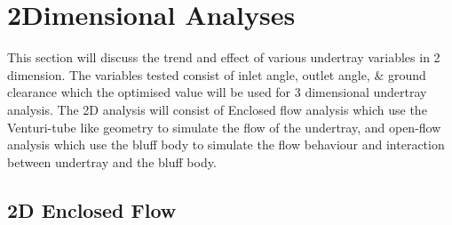 \newpage
\section{2Dimensional Analyses}
This section will discuss the trend and effect of various undertray variables in 2 dimension. The variables tested consist of inlet angle, outlet angle, \& ground clearance which the optimised value will be used for 3 dimensional undertray analysis. The 2D analysis will consist of Enclosed flow analysis which use the Venturi-tube like geometry to simulate the flow of the undertray, and open-flow analysis which use the bluff body to simulate the flow behaviour and interaction between undertray and the bluff body. 

\subsection{2D Enclosed Flow}